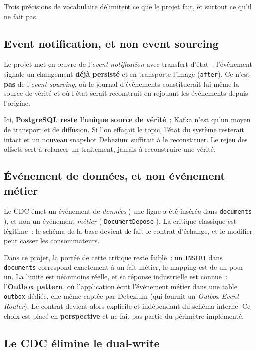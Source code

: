 \documentclass[12pt,a4paper,openany]{report}
\begin{document}
    Trois pr\'ecisions de vocabulaire d\'elimitent ce que le projet fait, et surtout ce qu'il ne fait pas.

    \subsection{Event notification, et non event sourcing}

    Le projet met en \oe uvre de l'\emph{event notification} avec transfert d'\'etat~: l'\'ev\'enement signale un changement \textbf{d\'ej\`a persist\'e} et en transporte l'image (\texttt{after}). Ce n'est \textbf{pas} de l'\emph{event sourcing}, o\`u le journal d'\'ev\'enements constituerait lui-m\^eme la source de v\'erit\'e et o\`u l'\'etat serait reconstruit en rejouant les \'ev\'enements depuis l'origine.

    Ici, \textbf{PostgreSQL reste l'unique source de v\'erit\'e}~; Kafka n'est qu'un moyen de transport et de diffusion. Si l'on effa\c{c}ait le topic, l'\'etat du syst\`eme resterait intact et un nouveau snapshot Debezium suffirait \`a le reconstituer. Le rejeu des offsets sert \`a relancer un traitement, jamais \`a reconstruire une v\'erit\'e.

    \subsection{\'Ev\'enement de donn\'ees, et non \'ev\'enement m\'etier}

    Le CDC \'emet un \'ev\'enement de \emph{donn\'ees} (\og{} une ligne a \'et\'e ins\'er\'ee dans \texttt{documents} \fg{}), et non un \'ev\'enement \emph{m\'etier} (\og{} \texttt{DocumentDepose} \fg{}). La critique classique est l\'egitime~: le sch\'ema de la base devient de fait le contrat d'\'echange, et le modifier peut casser les consommateurs.

    Dans ce projet, la port\'ee de cette critique reste faible~: un \texttt{INSERT} dans \texttt{documents} correspond exactement \`a un fait m\'etier, le mapping est de un pour un. La limite est n\'eanmoins r\'eelle, et sa r\'eponse industrielle est connue~: l'\textbf{Outbox pattern}, o\`u l'application \'ecrit l'\'ev\'enement m\'etier dans une table \texttt{outbox} d\'edi\'ee, elle-m\^eme capt\'ee par Debezium (qui fournit un \emph{Outbox Event Router}). Le contrat devient alors explicite et ind\'ependant du sch\'ema interne. Ce choix est plac\'e en \textbf{perspective} et ne fait pas partie du p\'erim\`etre impl\'ement\'e.

    \subsection{Le CDC \'elimine le dual-write}
\end{document}
